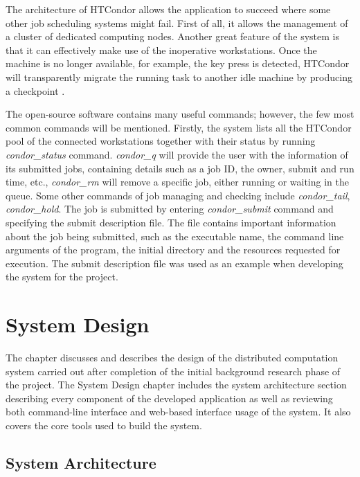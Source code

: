 \documentclass[10pt]{report}
\begin{document}
The architecture of HTCondor allows the application to succeed where some other job scheduling systems might fail. First of all, it allows the management of a cluster of dedicated computing nodes. Another great feature of the system is that it can effectively make use of the inoperative workstations. Once the machine is no longer available, for example, the key press is detected, HTCondor will transparently migrate the running task to another idle machine by producing a checkpoint \cite{whatisHTC}.
\newline

The open-source software contains many useful commands; however, the few most common commands will be mentioned. Firstly, the system lists all the HTCondor pool of the connected workstations together with their status by running \textit{condor\_status} command. \textit{condor\_q} will provide the user with the information of its submitted jobs, containing details such as a job ID, the owner, submit and run time, etc., \textit{condor\_rm} will remove a specific job, either running or waiting in the queue. Some other commands of job managing and checking include \textit{condor\_tail}, \textit{condor\_hold}. The job is submitted by entering \textit{condor\_submit} command and specifying the submit description file. The file contains important information about the job being submitted, such as the executable name, the command line arguments of the program, the initial directory and the resources requested for execution. The submit description file was used as an example when developing the system for the project.

\chapter{System Design}

The chapter discusses and describes the design of the distributed computation system carried out after completion of the initial background research phase of the project. The System Design chapter includes the system architecture section describing every component of the developed application as well as reviewing both command-line interface and web-based interface usage of the system. It also covers the core tools used to build the system.

\section{System Architecture}
\end{document}
